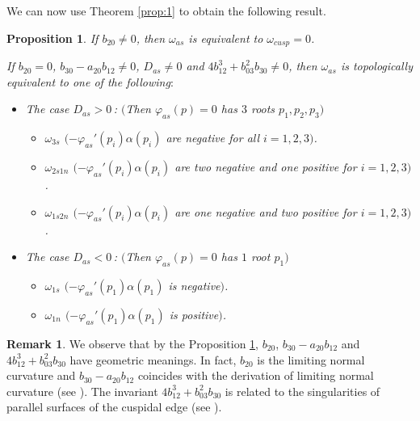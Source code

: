 \documentclass[a4paper, 12pt]{article}
\newtheorem{proposition}[theorem]{Proposition}
\theoremstyle{definition}
\newtheorem{remark}[theorem]{Remark}
\numberwithin{equation}{section}
\begin{document}
We can now use Theorem \ref{prop:1}
to obtain the following result.
\begin{proposition}\label{prop:asym}
If\/ $b_{20}\ne0$, 
then\/ $\omega_{as}$ is equivalent
to\/ $\omega_{cusp}=0$.

If\/ $b_{20}=0$, $b_{30}-a_{20} b_{12}\ne0$,
$D_{as}\ne0$ and\/ $4b_{12}^3 + b_{03}^2 b_{30}\ne0$,
then\/ $\omega_{as}$ is topologically equivalent
to one of the following\/$:$
\begin{itemize}
\item The case\/ $D_{as}>0$\,{\rm :} 
$($Then\/ ${\varphi}_{as}(p)=0$ has\/ $3$ roots\/ $p_1,p_2,p_3)$
\begin{itemize}
\item $\omega_{3s}$ $($$-{\varphi}_{as}'(p_i)\alpha(p_i)$ are
negative for all\/ $i=1,2,3)$.
\item $\omega_{2s1n}$ $($$-{\varphi}_{as}'(p_i)\alpha(p_i)$ are
two negative and one positive for\/ $i=1,2,3)$.
\item $\omega_{1s2n}$ $($$-{\varphi}_{as}'(p_i)\alpha(p_i)$ are
one negative and two positive for\/ $i=1,2,3)$.
\end{itemize}
\item The case $D_{as}<0$\,{\rm :} 
$($Then\/ ${\varphi}_{as}(p)=0$ has\/ $1$ root\/ $p_1)$
\begin{itemize}
\item $\omega_{1s}$ $($$-{\varphi}_{as}'(p_1)\alpha(p_1)$ is
negative\/$)$.
\item $\omega_{1n}$ $($$-{\varphi}_{as}'(p_1)\alpha(p_1)$ is
positive\/$)$.
\end{itemize}
\end{itemize}
\end{proposition}
\begin{remark}
We observe that
by the Proposition \ref{prop:asym},
$b_{20}$, $b_{30}-a_{20} b_{12}$ and $4b_{12}^3 + b_{03}^2 b_{30}$
have geometric meanings.
In fact, $b_{20}$ is the limiting normal curvature
and $b_{30}-a_{20} b_{12}$ coincides with the derivation 
of limiting normal curvature (see \cite{MSUY}).
The invariant $4b_{12}^3 + b_{03}^2 b_{30}$ is related to
the singularities of parallel surfaces of the cuspidal edge
(see \cite[Lemma 3.1]{teramoto}).
\end{remark}
\end{document}
